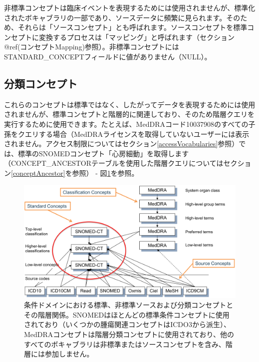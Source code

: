 \documentclass[
  11pt]{book}
\theoremstyle{definition}
\theoremstyle{definition}
\theoremstyle{definition}
\theoremstyle{definition}
\theoremstyle{remark}
\begin{document}
非標準コンセプトは臨床イベントを表現するためには使用されませんが、標準化されたボキャブラリの一部であり、ソースデータに頻繁に見られます。そのため、それらは「ソースコンセプト」とも呼ばれます。ソースコンセプトを標準コンセプトに変換するプロセスは「マッピング」と呼ばれます（セクション@ref(コンセプトMapping)参照）。非標準コンセプトにはSTANDARD\_CONCEPTフィールドに値がありません（NULL）。

\subsection{分類コンセプト}\label{ux5206ux985eux30b3ux30f3ux30bbux30d7ux30c8}

これらのコンセプトは標準ではなく、したがってデータを表現するためには使用されませんが、標準コンセプトと階層的に関連しており、そのため階層クエリを実行するために使用できます。たとえば、MedDRAコード10037908のすべての子孫をクエリする場合（MedDRAライセンスを取得していないユーザーには表示されません。アクセス制限についてはセクション\ref{accessVocabularies}参照）では、標準のSNOMEDコンセプト「心房細動」を取得します（CONCEPT\_ANCESTORテーブルを使用した階層クエリについてはセクション\ref{conceptAncestor}を参照） - 図\ref{fig:hierarchy}を参照。 

\begin{figure}

{\centering \includegraphics[width=1\linewidth]{images/StandardizedVocabularies/hierarchy} 

}

\caption{条件ドメインにおける標準、非標準ソースおよび分類コンセプトとその階層関係。SNOMEDはほとんどの標準条件コンセプトに使用されており（いくつかの腫瘍関連コンセプトはICDO3から派生）、MedDRAコンセプトは階層分類コンセプトに使用されており、他のすべてのボキャブラリは非標準またはソースコンセプトを含み、階層には参加しません。}\label{fig:hierarchy}
\end{figure}
\end{document}
